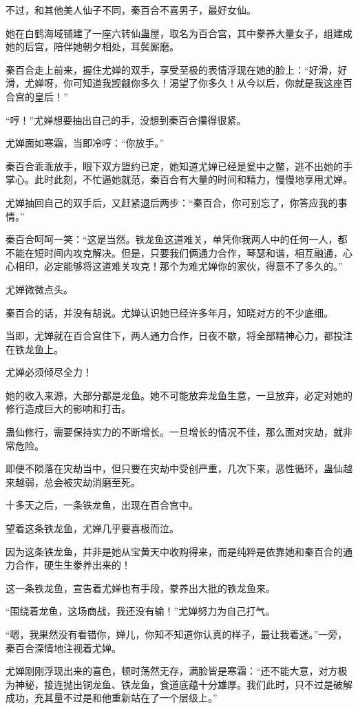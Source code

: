 \begin{this_body}
不过，和其他美人仙子不同，秦百合不喜男子，最好女仙。

她在白鹤海域铺建了一座六转仙蛊屋，取名为百合宫，其中豢养大量女子，组建成她的后宫，陪伴她朝夕相处，耳鬓厮磨。

秦百合走上前来，握住尤婵的双手，享受至极的表情浮现在她的脸上：“好滑，好滑，尤婵呀，你可知道我觊觎你多久！渴望了你多久！从今以后，你就是我这座百合宫的皇后！”

“哼！”尤婵想要抽出自己的手，没想到秦百合攥得很紧。

尤婵面如寒霜，当即冷哼：“你放手。”

秦百合乖乖放手，眼下双方盟约已定，她知道尤婵已经是瓮中之鳖，逃不出她的手掌心。此时此刻，不忙逼她就范，秦百合有大量的时间和精力，慢慢地享用尤婵。

尤婵抽回自己的双手后，又赶紧退后两步：“秦百合，你可别忘了，你答应我的事情。”

秦百合呵呵一笑：“这是当然。铁龙鱼这道难关，单凭你我两人中的任何一人，都不能在短时间内攻克解决。但是，只要我们俩通力合作，琴瑟和谐，相互融通，心心相印，必定能够将这道难关攻克！那个为难尤婵你的家伙，得意不了多久的。”

尤婵微微点头。

秦百合的话，并没有胡说。尤婵认识她已经许多年月，知晓对方的不少底细。

当即，尤婵就在百合宫住下，两人通力合作，日夜不歇，将全部精神心力，都投注在铁龙鱼上。

尤婵必须倾尽全力！

她的收入来源，大部分都是龙鱼。她不可能放弃龙鱼生意，一旦放弃，必定对她的修行造成巨大的影响和打击。

蛊仙修行，需要保持实力的不断增长。一旦增长的情况不佳，那么面对灾劫，就非常危险。

即便不陨落在灾劫当中，但只要在灾劫中受创严重，几次下来，恶性循环，蛊仙越来越弱，总会被灾劫消磨至死。

十多天之后，一条铁龙鱼，出现在百合宫中。

望着这条铁龙鱼，尤婵几乎要喜极而泣。

因为这条铁龙鱼，并非是她从宝黄天中收购得来，而是纯粹是依靠她和秦百合的通力合作，硬生生豢养出来的！

这一条铁龙鱼，宣告着尤婵也有手段，豢养出大批的铁龙鱼来。

“围绕着龙鱼，这场商战，我还没有输！”尤婵努力为自己打气。

“嗯，我果然没有看错你，婵儿，你知不知道你认真的样子，最让我着迷。”一旁，秦百合深情地注视着尤婵。

尤婵刚刚浮现出来的喜色，顿时荡然无存，满脸皆是寒霜：“还不能大意，对方极为神秘，接连抛出铜龙鱼、铁龙鱼，食道底蕴十分雄厚。我们此时，只不过是破解成功，充其量不过是和他重新站在了一个层级上。”


\end{this_body}
